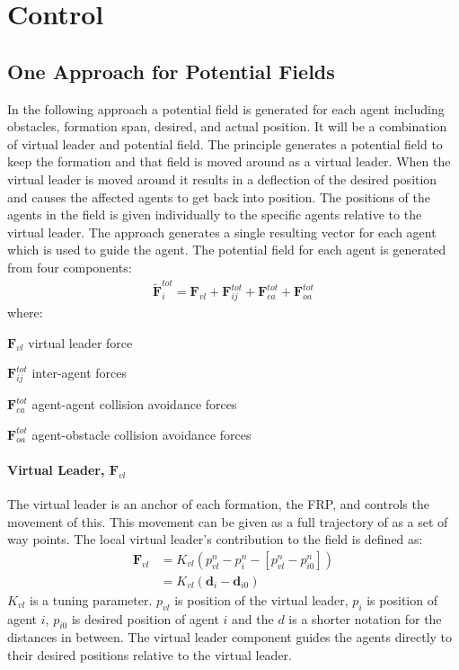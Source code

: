 \chapter{Control}
\label{ch:control}

\section{One Approach for Potential Fields}
\label{sc:one-approach}
In the following approach a potential field is generated for each
agent including obstacles, formation span, desired, and actual
position.  It will be a combination of virtual leader and potential
field. The principle generates a potential field to keep the formation
and that field is moved around as a virtual leader. When the virtual
leader is moved around it results in a deflection of the desired
position and causes the affected agents to get back into position. The
positions of the agents in the field is given individually to the
specific agents relative to the virtual leader. The approach generates
a single resulting vector for each agent which is used to guide the
agent. The potential field for each agent is generated from four
components:
\begin{align}
\tilde{\mathbf{F}}_i^{tot} = \mathbf{F}_{vl}+\mathbf{F}_{ij}^{tot}+\mathbf{F}_{ca}^{tot}+\mathbf{F}_{oa}^{tot}
\end{align}
where:
\begin{ffk}
\firmlist%
\item[$\mathbf{F}_{vl}$] virtual leader force
\item[$\mathbf{F}_{ij}^{tot}$] inter-agent forces
\item[$\mathbf{F}_{ca}^{tot}$] agent-agent collision avoidance forces
\item[$\mathbf{F}_{oa}^{tot}$] agent-obstacle collision avoidance forces
\end{ffk}

\subsubsection{Virtual Leader, $\mathbf{F}_{vl}$}
The virtual leader is an anchor of each formation, the \ac{FRP}, and
controls the movement of this. This movement can be given as a
full trajectory of as a set of way points. The local virtual leader's
contribution to the field is defined as:
\begin{align}
\mathbf{F}_{vl} &= K_{vl}(p_{vl}^n-p_i^n-[p_{vl}^n-p_{i0}^n])\\
&= K_{vl}(\mathbf{d}_i-\mathbf{d}_{i0})
\end{align}
$K_{vl}$ is a tuning parameter. $p_{vl}$ is position of the virtual
leader, $p_i$ is position of agent $i$, $p_{i0}$ is desired position
of agent $i$ and the $d$ is a shorter notation for the distances in
between. The virtual leader component guides the agents directly to
their desired positions relative to the virtual leader.

